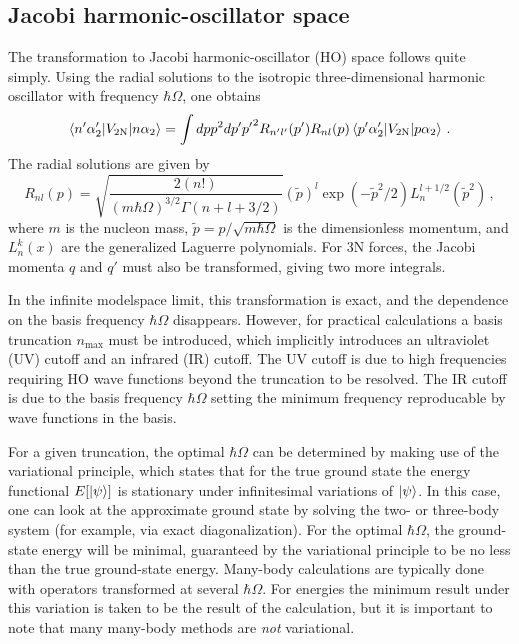 \subsection{Jacobi harmonic-oscillator space}

The transformation to Jacobi harmonic-oscillator (HO) space follows quite simply.
Using the radial solutions to the isotropic three-dimensional harmonic oscillator with frequency $\hbar \Omega$,
one obtains
\begin{equation}\label{eq:jacobi_ho_twobody}
  \braket{n' \alpha_{2}^{\prime}|V_{2\text{N}}|n \alpha_2} = \int dp p^2 dp' {p'}^2 R_{n'l'}(p') R_{nl}(p)
  \braket{p' \alpha_{2}^{\prime}|V_{2\text{N}}|p \alpha_2}\,.
\end{equation}
The radial solutions are given by
\begin{equation}
  R_{n l}(p) = \sqrt{\frac{2(n!)}{{(m \hbar \Omega)}^{3/2} \Gamma(n + l + 3/2)}}
  {\left(\widetilde{p}\right)}^{l}
  \exp(- \widetilde{p}^2/2)
  L^{l + 1/2}_{n}\left(\widetilde{p}^2\right)\,,
\end{equation}
where $m$ is the nucleon mass, $\widetilde{p}=p/\sqrt{m \hbar \Omega}$ is the dimensionless momentum,
and $L_{n}^{k}(x)$ are the generalized Laguerre polynomials.
For 3N forces, the Jacobi momenta $q$ and $q'$ must also be transformed, giving two more integrals.

In the infinite modelspace limit, this transformation is exact,
and the dependence on the basis frequency $\hbar \Omega$ disappears.
However, for practical calculations a basis truncation $n_{\text{max}}$ must be introduced,
which implicitly introduces an ultraviolet (UV) cutoff and an infrared (IR) cutoff.
The UV cutoff is due to high frequencies requiring HO wave functions beyond the truncation to be resolved.
The IR cutoff is due to the basis frequency $\hbar \Omega$ setting the minimum frequency reproducable by wave functions in the basis.

For a given truncation,
the optimal $\hbar \Omega$ can be determined by making use of the variational principle,
which states that for the true ground state
the energy functional $E[\ket{\psi}]$ is stationary
under infinitesimal variations of $\ket{\psi}$.
In this case, one can look at the approximate ground state by solving
the two- or three-body system (for example, via exact diagonalization).
For the optimal $\hbar \Omega$, the ground-state energy will be minimal,
guaranteed by the variational principle to be no less than the true ground-state energy.
Many-body calculations are typically done with operators transformed
at several $\hbar \Omega$.
For energies the minimum result under this variation
is taken to be the result of the calculation,
but it is important to note that many many-body methods are \textit{not} variational.

